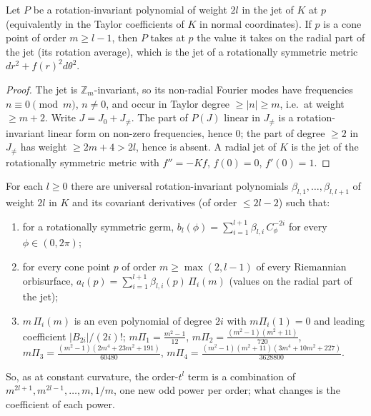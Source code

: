 \begin{lemma}\label{vc:radial}
Let $P$ be a rotation-invariant polynomial of weight $2l$ in the jet of $K$ at $p$ (equivalently in the
Taylor coefficients of $K$ in normal coordinates). If $p$ is a cone point of order $m\ge l-1$, then $P$
takes at $p$ the value it takes on the radial part of the jet (its rotation average), which is the jet of a
rotationally symmetric metric $dr^2+f(r)^2d\theta^2$.
\end{lemma}

\begin{proof}
The jet is $\mathbb Z_m$-invariant, so its non-radial Fourier modes have frequencies $n\equiv0\pmod m$,
$n\ne0$, and occur in Taylor degree $\ge|n|\ge m$, i.e.\ at weight $\ge m+2$. Write $J=J_0+J_{\ne}$. The
part of $P(J)$ linear in $J_{\ne}$ is a rotation-invariant linear form on non-zero frequencies, hence $0$;
the part of degree $\ge2$ in $J_\ne$ has weight $\ge2m+4>2l$, hence is absent. A radial jet of $K$ is the
jet of the rotationally symmetric metric with $f''=-Kf$, $f(0)=0$, $f'(0)=1$.
\end{proof}

\begin{theorem}\label{vc:VC1}
For each $l\ge0$ there are universal rotation-invariant polynomials $\beta_{l,1},\dots,\beta_{l,l+1}$ of
weight $2l$ in $K$ and its covariant derivatives (of order $\le2l-2$) such that:
\begin{enumerate}[label=(\roman*)]
\item for a rotationally symmetric germ, $b_l(\phi)=\sum_{i=1}^{l+1}\beta_{l,i}\,C_\phi^{-2i}$ for every $\phi\in(0,2\pi)$;
\item for every cone point $p$ of order $m\ge\max(2,l-1)$ of every Riemannian orbisurface,
$a_l(p)=\sum_{i=1}^{l+1}\beta_{l,i}(p)\,\Pi_i(m)$ (values on the radial part of the jet);
\item $m\,\Pi_i(m)$ is an even polynomial of degree $2i$ with $m\Pi_i(1)=0$ and leading coefficient
$|B_{2i}|/(2i)!$; $m\Pi_1=\frac{m^2-1}{12}$, $m\Pi_2=\frac{(m^2-1)(m^2+11)}{720}$,
$m\Pi_3=\frac{(m^2-1)(2m^4+23m^2+191)}{60480}$, $m\Pi_4=\frac{(m^2-1)(m^2+11)(3m^4+10m^2+227)}{3628800}$.
\end{enumerate}
So, as at constant curvature, the order-$t^l$ term is a combination of $m^{2l+1},m^{2l-1},\dots,m,1/m$,
one new odd power per order; what changes is the coefficient of each power.
\end{theorem}

